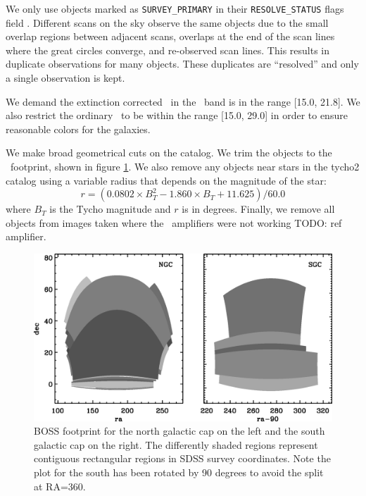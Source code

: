\documentclass[preprint]{aastex}
\newcommand{\modelrmin}{15.0}
\newcommand{\modelrmax}{29.0}
\newcommand{\rmin}{15.0}
\newcommand{\rmax}{21.8}
\begin{document}
We only use objects marked as \texttt{SURVEY\_PRIMARY} in their
\texttt{RESOLVE\_STATUS} flags field \citep{dr7resolve}. Different scans on the
sky observe the same objects due to the small overlap regions between adjacent
scans, overlaps at the end of the scan lines where the great circles converge,
and re-observed scan lines.  This results in duplicate observations for many
objects.  These duplicates are ``resolved'' and only a single observation is
kept.

We demand the extinction corrected \citep{Schlegel98} \cmodelmag\ in the \rmag\
band is in the range [\rmin, \rmax].  We also restrict the ordinary \modelmag\
to be within the range [\modelrmin, \modelrmax] in order to ensure reasonable
colors for the galaxies.

We make broad geometrical cuts on the catalog.  We trim the objects to the
\boss\ footprint, shown in figure \ref{fig:footprint}. We also remove any
objects near stars in the tycho2 catalog \citep{tycho2} using a variable radius
that depends on the magnitude of the star:
\begin{equation}
r = (0.0802\times B_T^2 - 1.860\times B_T + 11.625)/60.0
\end{equation}
where $B_T$ is the Tycho magnitude and $r$ is in degrees.  Finally, we remove
all objects from images taken where the \umag\ amplifiers were not working
TODO: ref amplifier.

\begin{figure}[t] \centering
 \centering 
 \includegraphics[scale=0.5]{figures/ngc-sgc-poly.eps}
 \caption{BOSS footprint for the north galactic cap on the left
 and the south galactic cap on the right.  The differently shaded
 regions represent contiguous rectangular regions in SDSS survey coordinates.
 Note the plot for the south has been rotated by 90 degrees to avoid
 the split at RA=360.}
 \label{fig:footprint}
\end{figure}
\end{document}
